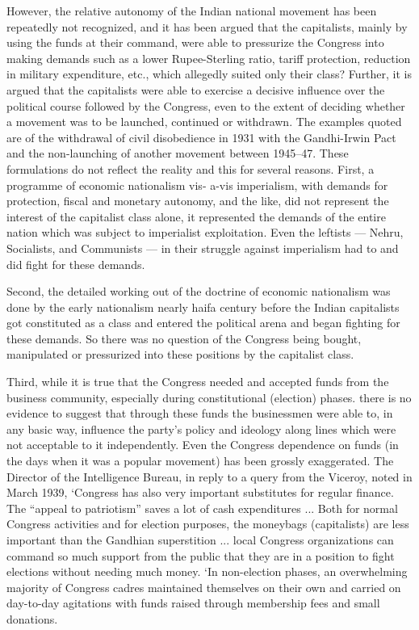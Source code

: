 However, the relative autonomy of the Indian national movement has been repeatedly not recognized, and it has been argued that the capitalists, mainly by using the funds at their command, were able to pressurize the Congress into making demands such as a lower Rupee-Sterling ratio, tariff protection, reduction in military expenditure, etc., which allegedly suited only their class? Further, it is argued that the capitalists were able to exercise a decisive influence over the political course followed by the Congress, even to the extent of deciding whether a movement was to be launched, continued or withdrawn. The examples quoted are of the withdrawal of civil disobedience in 1931 with the Gandhi-Irwin Pact and the non-launching of another movement between 1945--47. These formulations do not reflect the reality and this for several reasons. First, a programme of economic nationalism vis- a-vis imperialism, with demands for protection, fiscal and monetary autonomy, and the like, did not represent the interest of the capitalist class alone, it represented the demands of the entire nation which was subject to imperialist exploitation. Even the leftists --- Nehru, Socialists, and Communists --- in their struggle against imperialism had to and did fight for these demands. 

Second, the detailed working out of the doctrine of economic nationalism was done by the early nationalism nearly haifa century before the Indian capitalists got constituted as a class and entered the political arena and began fighting for these demands. So there was no question of the Congress being bought, manipulated or pressurized into these positions by the capitalist class. 

Third, while it is true that the Congress needed and accepted funds from the business community, especially during constitutional (election) phases. there is no evidence to suggest that through these funds the businessmen were able to, in any basic way, influence the party's policy and ideology along lines which were not acceptable to it independently. Even the Congress dependence on funds (in the days when it was a popular movement) has been grossly exaggerated. The Director of the Intelligence Bureau, in reply to a query from the Viceroy, noted in March 1939, `Congress has also very important substitutes for regular finance. The ``appeal to patriotism'' saves a lot of cash expenditures ... Both for normal Congress activities and for election purposes, the moneybags (capitalists) are less important than the Gandhian superstition ... local Congress organizations can command so much support from the public that they are in a position to fight elections without needing much money. `In non-election phases, an overwhelming majority of Congress cadres maintained themselves on their own and carried on day-to-day agitations with funds raised through membership fees and small donations. 

